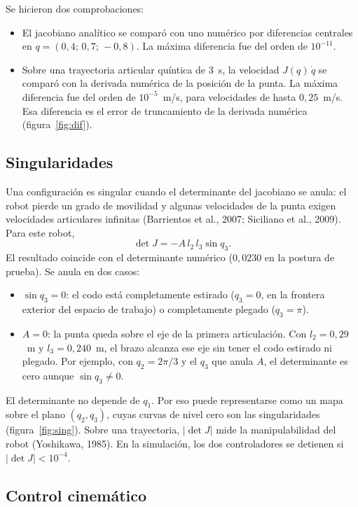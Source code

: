 \documentclass[11pt,a4paper]{article}
\begin{document}
Se hicieron dos comprobaciones:
\begin{itemize}
\item El jacobiano analítico se comparó con uno numérico por diferencias centrales en \(q=(0{,}4;\,0{,}7;\,-0{,}8)\). La máxima diferencia fue del orden de \(10^{-11}\).
\item Sobre una trayectoria articular quíntica de 3~s, la velocidad \(J(q)\,\dot q\) se comparó con la derivada numérica de la posición de la punta. La máxima diferencia fue del orden de \(10^{-5}\)~m/s, para velocidades de hasta \(0{,}25\)~m/s. Esa diferencia es el error de truncamiento de la derivada numérica (figura~\ref{fig:dif}).
\end{itemize}

\subsection{Singularidades}

Una configuración es singular cuando el determinante del jacobiano se anula: el robot pierde un grado de movilidad y algunas velocidades de la punta exigen velocidades articulares infinitas (Barrientos et al., 2007; Siciliano et al., 2009). Para este robot,
\begin{equation}
\det J=-A\, l_2\, l_3\sin q_3 .
\end{equation}
El resultado coincide con el determinante numérico (\(0{,}0230\) en la postura de prueba). Se anula en dos casos:
\begin{itemize}
\item \(\sin q_3=0\): el codo está completamente estirado (\(q_3=0\), en la frontera exterior del espacio de trabajo) o completamente plegado (\(q_3=\pi\)).
\item \(A=0\): la punta queda sobre el eje de la primera articulación. Con \(l_2=0{,}29\)~m y \(l_3=0{,}240\)~m, el brazo alcanza ese eje sin tener el codo estirado ni plegado. Por ejemplo, con \(q_2=2\pi/3\) y el \(q_3\) que anula \(A\), el determinante es cero aunque \(\sin q_3\neq 0\).
\end{itemize}

El determinante no depende de \(q_1\). Por eso puede representarse como un mapa sobre el plano \((q_2,q_3)\), cuyas curvas de nivel cero son las singularidades (figura~\ref{fig:sing}). Sobre una trayectoria, \(|\det J|\) mide la manipulabilidad del robot (Yoshikawa, 1985). En la simulación, los dos controladores se detienen si \(|\det J|<10^{-4}\).

\subsection{Control cinemático}
\end{document}
